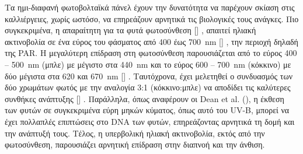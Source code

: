 \documentclass[12pt, a4paper]{report} %
\DeclareRobustCommand{\lcitep}[1]{%
  \english{[\cite{#1}]}%
}
\newcommand{\english}{\foreignlanguage{english}}
\begin{document}
Τα ημι-διαφανή φωτοβολταϊκά πάνελ έχουν την δυνατότητα να παρέχουν σκίαση στις καλλιέρ\-γειες, χωρίς ωστόσο, να 
επηρεάζουν αρνητικά τις βιολογικές τους ανάγκες. Πιο συγκεκριμένα, η απαραίτητη για τα φυτά φωτοσύνθεση 
\lcitep{eisagwgi_alg_bib17}, απαιτεί ηλιακή ακτινοβολία σε ένα εύρος του φάσματος από 400 έως \SI{700}{\nano\meter} 
\lcitep{eisagwgi_alg_bib18}, την περιοχή δηλαδή της \english{PAR}. Η μεγαλύτερη επίδραση στη φωτοσύνθεση παρουσιάζεται από το 
εύρος 400 – \SI{500}{\nano\meter} (μπλε) με μέγιστο στα \SI{440}{\nano\meter} και το εύρος 600 – \SI{700}{\nano\meter} 
(κόκκινο) με δύο μέγιστα στα 620 και \SI{670}{\nano\meter} \lcitep{eisagwgi_adv_alg_bib17}. Ταυτόχρονα, έχει μελετηθεί ο 
συνδυασμός των δύο χρωμάτων φωτός με την αναλογία 3:1 (κόκκινο:μπλε) να αποδίδει τις καλύτερες συνθήκες ανάπτυξης 
\lcitep{eisagwgi_adv_alg_bib18,eisagwgi_adv_alg_bib19,eisagwgi_adv_alg_bib20}. Παράλληλα, όπως αναφέρουν οι \english{Dean et al.} 
(\citeyear{eisagwgi_alg_bib20}), η έκθεση των φυτών σε συγκεκριμένα εύρη μηκών κύματος, όπως αυτό του \english{UV-B}, 
μπορεί να έχει πολλαπλές επιπτώσεις στο \english{DNA} των φυτών, επηρεάζοντας αρνητικά τη δομή και την ανάπτυξή τους. 
Τέλος, η υπερβολική ηλιακή ακτινοβολία, εκτός από την φωτοσύνθεση, παρουσιάζει αρνητική επίδραση στην διαπνοή και την 
άνθιση. 
\end{document}
